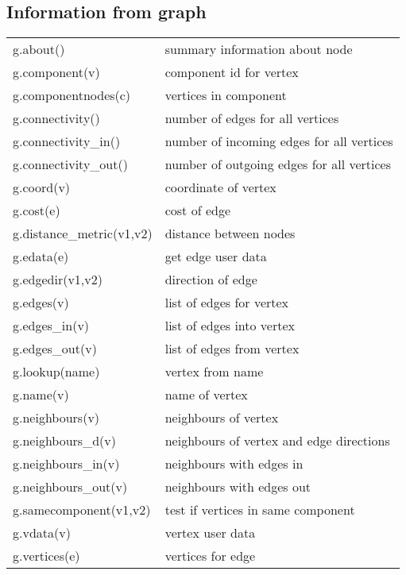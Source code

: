 \subsection*{Information from graph}
\begin{longtable}{lp{120mm}}
g.about() & summary information about node\\ 
g.component(v) & component id for vertex\\ 
g.componentnodes(c) & vertices in component\\ 
g.connectivity() & number of edges for all vertices\\ 
g.connectivity\_in() & number of incoming edges for all vertices\\ 
g.connectivity\_out() & number of outgoing edges for all vertices\\ 
g.coord(v) & coordinate of vertex\\ 
g.cost(e) & cost of edge\\ 
g.distance\_metric(v1,v2) & distance between nodes\\ 
g.edata(e) & get edge user data\\ 
g.edgedir(v1,v2) & direction of edge\\ 
g.edges(v) & list of edges for vertex\\ 
g.edges\_in(v) & list of edges into vertex\\ 
g.edges\_out(v) & list of edges from vertex\\ 
g.lookup(name) & vertex from name\\ 
g.name(v) & name of vertex\\ 
g.neighbours(v) & neighbours of vertex\\ 
g.neighbours\_d(v) & neighbours of vertex and edge directions\\ 
g.neighbours\_in(v) & neighbours with edges in\\ 
g.neighbours\_out(v) & neighbours with edges out\\ 
g.samecomponent(v1,v2) & test if vertices in same component\\ 
g.vdata(v) & vertex user data\\ 
g.vertices(e) & vertices for edge\\ 
\end{longtable}\vspace{1ex}

